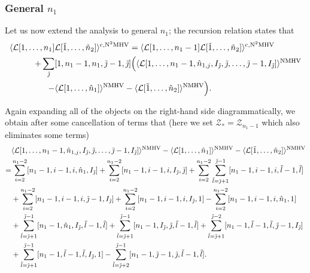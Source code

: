 \documentclass[12pt]{article}
\numberwithin{equation}{section}
\begin{document}
\subsubsection{General \texorpdfstring{\(n_1\)}{n1}}
Let us now extend the analysis to general \(n_1\); the recursion relation states that 
\begin{align}
\langle \mathcal{L}[1,\ldots,n_1]&\mathcal{L}[\tilde{1},\ldots,\tilde{n}_2]\rangle^{\rm{c,N}^2\rm{MHV}} = \langle \mathcal{L}[1,\ldots,n_1-1]\mathcal{L}[\tilde{1},\ldots,\tilde{n}_2]\rangle^{\rm{c,N}^2\rm{MHV}} \notag \\
+\sum_{\tilde{\jmath}}&[1,n_1-1,n_1,\tilde{\jmath}-1,\tilde{\jmath}]\Bigl( \langle \mathcal{L}[1,\ldots,n_1-1,\hat{n}_{1,j}, I_{\tilde{\jmath}},\tilde{\jmath},\ldots,\tilde{\jmath}-1,I_{\tilde{\jmath}}] \rangle^{\rm NMHV}  \notag \\
-& \langle \mathcal{L}[1,\ldots,\hat{n}_1]\rangle^{\rm NMHV} - \langle \mathcal{L}[\tilde{1},\ldots,\hat{n}_2]\rangle^{\rm NMHV} \Bigr).
\end{align}

Again expanding all of the objects on the right-hand side diagrammatically, we obtain after some cancellation of terms that (here we set \(\mathcal{Z}_* = \mathcal{Z}_{n_1-1}\) which also eliminates some terms)
\begin{align}
 &\langle \mathcal{L}[1,\ldots,n_1-1,\hat{n}_{1,j}, I_{\tilde{\jmath}},\tilde{\jmath},\ldots,\tilde{\jmath}-1,I_{\tilde{\jmath}}] \rangle^{\rm NMHV} - \langle \mathcal{L}[1,\ldots,\hat{n}_1]\rangle^{\rm NMHV} - \langle \mathcal{L}[\tilde{1},\ldots,\hat{n}_2]\rangle^{\rm NMHV} \notag \\
=&
\sum_{i=2}^{n_1-2}[n_1-1, i-1,i,\hat{n}_1,I_{\tilde{\jmath}}] + \sum_{i=2}^{n_1-2}[n_1-1,i-1,i,I_{\tilde{\jmath}},\tilde{\jmath}] + \sum_{i=2}^{n_1-2}\sum_{\tilde{l}=\tilde{\jmath}+1}^{\tilde{\jmath}-1}[n_1-1,i-1,i,\tilde{l}-1,\tilde{l}] \notag \\
&+ \sum_{i=2}^{n_1-2}[n_1-1,i-1,i,\tilde{\jmath}-1,I_{\tilde{\jmath}}] +\sum_{i=2}^{n_1-2}[n_1-1,i-1,i,I_{\tilde{\jmath}},1] - \sum_{i=2}^{n_1-2}[n_1-1,i-1,i,\hat{n}_1,1] \notag \\&+\sum_{\tilde{l}=\tilde{\jmath}+1}^{\tilde{\jmath}-1}[n_1-1,\hat{n}_1,I_{\tilde{\jmath}},\tilde{l}-1,\tilde{l}] +\sum_{\tilde{l}=\tilde{\jmath}+1}^{\tilde{\jmath}-1}[n_1-1,I_{\tilde{\jmath}},\tilde{\jmath},\tilde{l}-1,\tilde{l}] + \sum_{\tilde{l}=\tilde{\jmath}+1}^{\tilde{\jmath}-2}[n_1-1,\tilde{l}-1,\tilde{l},\tilde{\jmath}-1,I_{\tilde{\jmath}}]\notag \\
& + \sum_{\tilde{l}=\tilde{\jmath}+1}^{\tilde{\jmath}-1}[n_1-1,\tilde{l}-1,\tilde{l},I_{\tilde{\jmath}},1] - \sum_{\tilde{l} = \tilde{\jmath}+2}^{\tilde{\jmath}-1}[n_1-1,\tilde{\jmath}-1,\tilde{\jmath},\tilde{l}-1,\tilde{l}].
\end{align}
\end{document}
